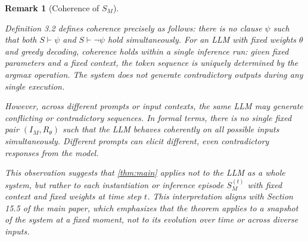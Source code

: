 \documentclass[11pt]{article}
\newtheorem{remark}[theorem]{Remark}
\begin{document}
\begin{remark}[Coherence of $S_M$]
\label{rem:coherence_llm}

Definition 3.2 defines coherence precisely as follows: there is no clause $\psi$ such that both $S \vdash \psi$ and $S \vdash \neg\psi$ hold simultaneously. For an LLM with fixed weights $\theta$ and greedy decoding, coherence holds \textit{within a single inference run}: given fixed parameters and a fixed context, the token sequence is uniquely determined by the argmax operation. The system does not generate contradictory outputs during any single execution.

However, across different prompts or input contexts, the same LLM may generate conflicting or contradictory sequences. In formal terms, there is no single fixed pair $(I_M, R_\theta)$ such that the LLM behaves coherently on all possible inputs simultaneously. Different prompts can elicit different, even contradictory responses from the model.

This observation suggests that \ref{thm:main} applies not to the LLM \textit{as a whole system}, but rather to each instantiation or inference episode $S_M^{(t)}$ with fixed context and fixed weights at time step $t$. This interpretation aligns with Section 15.5 of the main paper, which emphasizes that the theorem applies to a snapshot of the system at a fixed moment, not to its evolution over time or across diverse inputs.

\end{remark}
\end{document}
